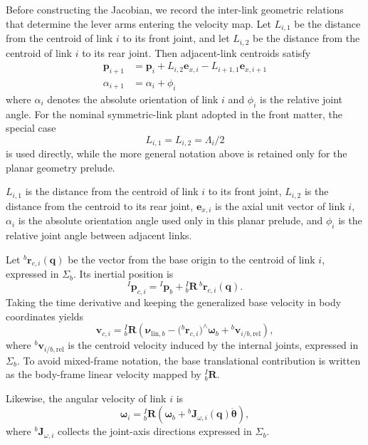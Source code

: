 \documentclass[12pt,a4paper]{report}
\newcommand{\newsymbols}[1]{\par\noindent{}#1\par\vspace{0.35em}}
\newcommand{\Frame}[1]{\Sigma_{#1}}
\begin{document}
Before constructing the Jacobian, we record the inter-link geometric relations that determine the lever arms entering the velocity map. Let $L_{i,1}$ be the distance from the centroid of link $i$ to its front joint, and let $L_{i,2}$ be the distance from the centroid of link $i$ to its rear joint. Then adjacent-link centroids satisfy
\begin{align}
\mathbf{p}_{i+1} &= \mathbf{p}_i + L_{i,2}\mathbf{e}_{x,i} - L_{i+1,1}\mathbf{e}_{x,i+1} \label{eq:old-93} \\
\alpha_{i+1} &= \alpha_i + \phi_i \label{eq:old-94}
\end{align}
where $\alpha_i$ denotes the absolute orientation of link $i$ and $\phi_i$ is the relative joint angle. For the nominal symmetric-link plant adopted in the front matter, the special case
\begin{equation}
L_{i,1} = L_{i,2} = \Lambda_i/2
\end{equation}
is used directly, while the more general notation above is retained only for the planar geometry prelude.
\newsymbols{$L_{i,1}$ is the distance from the centroid of link $i$ to its front joint, $L_{i,2}$ is the distance from the centroid to its rear joint, $\mathbf{e}_{x,i}$ is the axial unit vector of link $i$, $\alpha_i$ is the absolute orientation angle used only in this planar prelude, and $\phi_i$ is the relative joint angle between adjacent links.}

Let ${}^{b}\mathbf{r}_{c,i}(\mathbf{q})$ be the vector from the base origin to the centroid of link $i$, expressed in $\Frame{b}$. Its inertial position is
\begin{equation}
{}^{I}\mathbf{p}_{c,i}
=
{}^{I}\mathbf{p}_{b}
+
{}_{b}^{I}\mathbf{R}\,{}^{b}\mathbf{r}_{c,i}(\mathbf{q}).
\end{equation}
Taking the time derivative and keeping the generalized base velocity in body coordinates yields
\begin{equation}
\mathbf{v}_{c,i}
=
{}_{b}^{I}\mathbf{R}
\left(
\boldsymbol{\nu}_{\mathrm{lin},b}
- \bigl({}^{b}\mathbf{r}_{c,i}\bigr)^\wedge \boldsymbol{\omega}_b
+ {}^{b}\mathbf{v}_{i/b,\mathrm{rel}}
\right),
\end{equation}
where ${}^{b}\mathbf{v}_{i/b,\mathrm{rel}}$ is the centroid velocity induced by the internal joints, expressed in $\Frame{b}$. To avoid mixed-frame notation, the base translational contribution is written as the body-frame linear velocity mapped by ${}_{b}^{I}\mathbf{R}$.

Likewise, the angular velocity of link $i$ is
\begin{equation}
\boldsymbol{\omega}_i
=
{}_{b}^{I}\mathbf{R}
\left(
\boldsymbol{\omega}_b + {}^{b}\mathbf{J}_{\omega,i}(\mathbf{q})\dot{\boldsymbol{\theta}}
\right),
\end{equation}
where ${}^{b}\mathbf{J}_{\omega,i}$ collects the joint-axis directions expressed in $\Frame{b}$.
\end{document}
